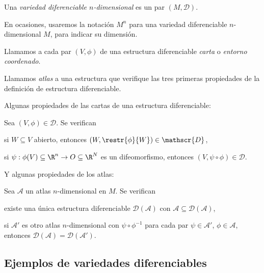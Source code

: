 \begin{ndef}
  Una \emph{variedad diferenciable $n$-dimensional} es un par $(M, \mathscr{D})$.
\end{ndef}
\begin{notacion}
  En ocasiones, usaremos la notación $M^{n}$ para una variedad diferenciable
  $n$-dimensional $M$, para indicar su dimensión.
\end{notacion}

Llamamos a cada par $(V,\phi)$ de una estructura diferenciable \emph{carta} o
\emph{entorno coordenado}.

\begin{ndef}[Atlas]
  Llamamos \emph{atlas} a una estructura que verifique las tres primeras
  propiedades de la definición de estructura diferenciable.
\end{ndef}

Algunas propiedades de las cartas de una estructura diferenciable:
\begin{nprop}
  Sea $(V,\phi)\in\mathscr{D}$. Se verifican
  \begin{nlist}
  \item
    si $W\subseteq V$ abierto, entonces
$(W,\restr{\phi}{W})\in\mathscr{D}$,
  \item 
    si $\psi: \phi(V) \subseteq \R^{n} \to O\subseteq\R^{N}$ es un
    difeomorfismo, entonces $(V, \psi\circ\phi)\in\mathscr{D}$.
  \end{nlist}
\end{nprop}

Y algunas propiedades de los atlas:
\begin{nprop}
  Sea $\mathscr{A}$ un atlas $n$-dimensional en $M$. Se verifican
  \begin{nlist}
  \item
    existe una única estructura diferenciable $\mathscr{D}(\mathscr{A})$ con
    $\mathscr{A}\subseteq \mathscr{D}(\mathscr{A})$,
  \item
    si $\mathscr{A}'$ es otro atlas $n$-dimensional con $\psi\circ\phi^{-1}$
    para cada par $\psi\in \mathscr{A}'$, $\phi\in \mathscr{A}$, entonces
    $\mathscr{D}(\mathscr{A}) = \mathscr{D}(\mathscr{A}')$.
  \end{nlist}
\end{nprop}

\subsection{Ejemplos de variedades diferenciables}

